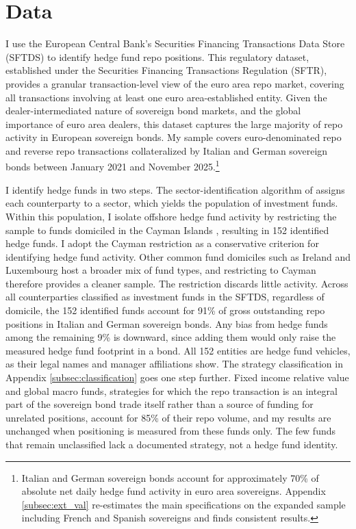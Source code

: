 \documentclass[english, 11pt, oneside]{article}
\begin{document}
\section{Data}
\label{sec:data}

I use the European Central Bank’s Securities Financing Transactions Data Store (SFTDS) to identify hedge fund repo positions. This regulatory dataset, established under the Securities Financing Transactions Regulation (SFTR), provides a granular transaction-level view of the euro area repo market, covering all transactions involving at least one euro area-established entity. Given the dealer-intermediated nature of sovereign bond markets, and the global importance of euro area dealers, this dataset captures the large majority of repo activity in European sovereign bonds. My sample covers euro-denominated repo and reverse repo transactions collateralized by Italian and German sovereign bonds between January 2021 and November 2025.\footnote{Italian and German sovereign bonds account for approximately 70\% of absolute net daily hedge fund activity in euro area sovereigns. Appendix \ref{subsec:ext_val} re-estimates the main specifications on the expanded sample including French and Spanish sovereigns and finds consistent results.} 

I identify hedge funds in two steps. The sector-identification algorithm of \citet{lenoci2021} assigns each counterparty to a sector, which yields the population of investment funds. Within this population, I isolate offshore hedge fund activity by restricting the sample to funds domiciled in the Cayman Islands \citep[see][for a discussion on the relevance of Cayman Island domiciled hedge funds]{barth2025cross}, resulting in 152 identified hedge funds. I adopt the Cayman restriction as a conservative criterion for identifying hedge fund activity. Other common fund domiciles such as Ireland and Luxembourg host a broader mix of fund types, and restricting to Cayman therefore provides a cleaner sample. The restriction discards little activity. Across all counterparties classified as investment funds in the SFTDS, regardless of domicile, the 152 identified funds account for 91\% of gross outstanding repo positions in Italian and German sovereign bonds. Any bias from hedge funds among the remaining 9\% is downward, since adding them would only raise the measured hedge fund footprint in a bond. All 152 entities are hedge fund vehicles, as their legal names and manager affiliations show. The strategy classification in Appendix \ref{subsec:classification} goes one step further. Fixed income relative value and global macro funds, strategies for which the repo transaction is an integral part of the sovereign bond trade itself rather than a source of funding for unrelated positions, account for 85\% of their repo volume, and my results are unchanged when positioning is measured from these funds only. The few funds that remain unclassified lack a documented strategy, not a hedge fund identity.
\end{document}
